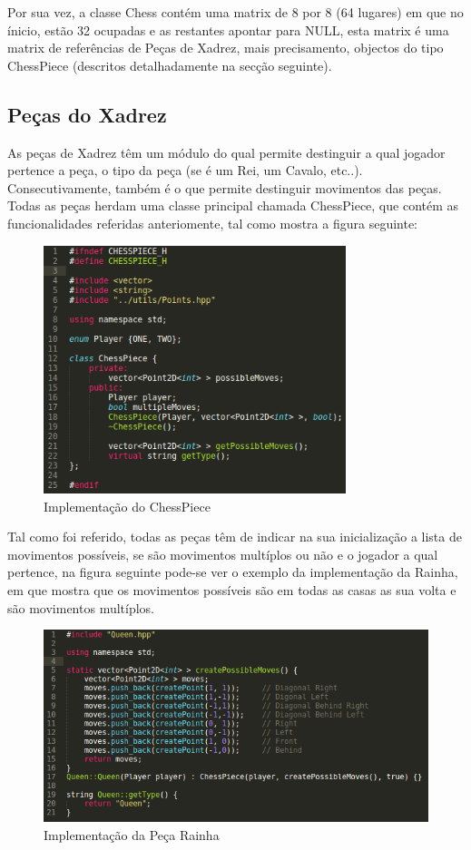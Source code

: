 \documentclass[11pt,a4paper]{report}
\begin{document}
Por sua vez, a classe Chess contém uma matrix de 8 por 8 (64 lugares) em que no ínicio, estão 32 ocupadas e as restantes apontar para NULL, esta matrix é uma matrix de referências de Peças de Xadrez, mais precisamento, objectos do tipo ChessPiece (descritos detalhadamente na secção seguinte).

\subsection{Peças do Xadrez}

As peças de Xadrez têm um módulo do qual permite destinguir a qual jogador pertence a peça, o tipo da peça (se é um Rei, um Cavalo, etc..). Consecutivamente, também é o que permite destinguir movimentos das peças.\\

Todas as peças herdam uma classe principal chamada ChessPiece, que contém as funcionalidades referidas anteriomente, tal como mostra a figura seguinte:

\begin{figure}[H]
\centerline{\includegraphics[width=250pt]{images/chesspiece.png}}
\caption{Implementação do ChessPiece}
\label{img:complete}
\end{figure}

Tal como foi referido, todas as peças têm de indicar na sua inicialização a lista de movimentos possíveis, se são movimentos multíplos ou não e o jogador a qual pertence, na figura seguinte pode-se ver o exemplo da implementação da Rainha, em que mostra que os movimentos possíveis são em todas as casas as sua volta e são movimentos multíplos.

\begin{figure}[H]
\centerline{\includegraphics[width=380pt]{images/queen.png}}
\caption{Implementação da Peça Rainha}
\label{img:complete}
\end{figure}
\end{document}
